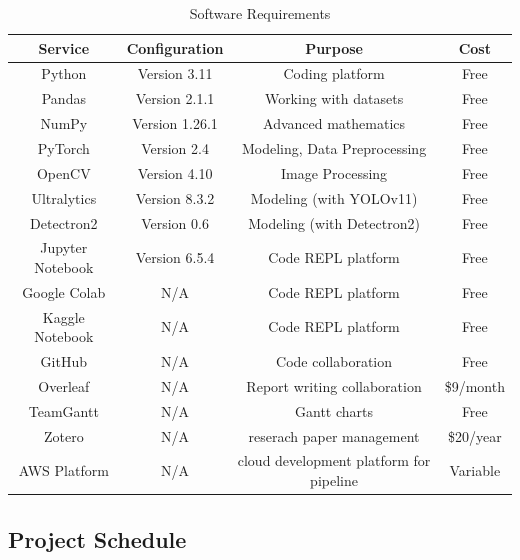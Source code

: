 \documentclass[stu,12pt,floatsintext]{apa7}
\begin{document}
\begin{table}[!htb]
	\centering
	\caption{Software Requirements}
	\begin{tabular}{cccc}
		\hline
		Service          & Configuration  & Purpose                      & Cost      \\
		\hline
		Python           & Version 3.11   & Coding platform              & Free      \\
		Pandas           & Version 2.1.1  & Working with datasets        & Free      \\
		NumPy            & Version 1.26.1 & Advanced mathematics         & Free      \\
		PyTorch          & Version 2.4    & Modeling, Data Preprocessing & Free      \\
		OpenCV           & Version 4.10   & Image Processing             & Free      \\
		Ultralytics      & Version 8.3.2  & Modeling (with YOLOv11)       & Free      \\
		Detectron2       & Version 0.6    & Modeling (with Detectron2)   & Free      \\
		Jupyter Notebook & Version 6.5.4  & Code REPL platform           & Free      \\
		Google Colab     & N/A            & Code REPL platform           & Free      \\
		Kaggle Notebook  & N/A            & Code REPL platform           & Free      \\
		GitHub           & N/A            & Code collaboration           & Free      \\
		Overleaf         & N/A            & Report writing collaboration & \$9/month \\
		TeamGantt        & N/A            & Gantt charts                 & Free      \\
        Zotero           & N/A            & reserach paper management    & \$20/year \\
        AWS Platform     & N/A            & cloud development platform for pipeline& Variable \\ 
		\hline
	\end{tabular}
	\label{tab:software}
\end{table}

\subsection{Project Schedule}
\end{document}
